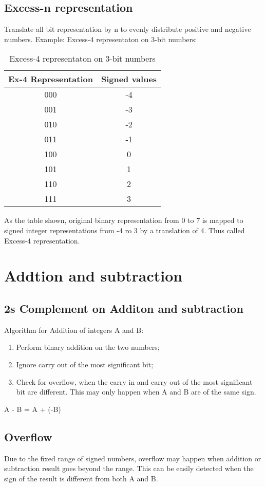 \documentclass[12pt]{article} %
\begin{document}
\subsection*{Excess-n representation}
Translate all bit representation by n to evenly distribute positive and negative numbers.
Example: Excess-4 representaton on 3-bit numbers:
\begin{table}[h!]
    \centering
    \begin{tabular}{|c|c|}
    \hline
    \textbf{Ex-4 Representation} & \textbf{Signed values} \\
    \hline
    000 & -4 \\
    001 & -3 \\
    010 & -2 \\
    011 & -1 \\
    100 & 0 \\
    101 & 1 \\
    110 & 2 \\
    111 & 3 \\
    \hline
    \end{tabular}
    \caption{Excess-4 representaton on 3-bit numbers}
\end{table}

As the table shown, original binary representation from 0 to 7 is mapped to signed integer representations from -4 ro 3 by a translation of 4. Thus called Excess-4 representation.



\section{Addtion and subtraction}
\subsection*{2s Complement on Additon and subtraction}
Algorithm for Addition of integers A and B:
\begin{enumerate}
    \item Perform binary addition on the two numbers;
    \item Ignore carry out of the most significant bit;
    \item Check for overflow, when the carry in and carry out of the most significant bit are different. This may only happen when A and B are of the same sign.
\end{enumerate}
A - B = A + (-B)

\subsection*{Overflow}
Due to the fixed range of signed numbers, overflow may happen when addition or subtraction result goes beyond the range.
This can be easily detected when the sign of the result is different from both A and B.
\end{document}

